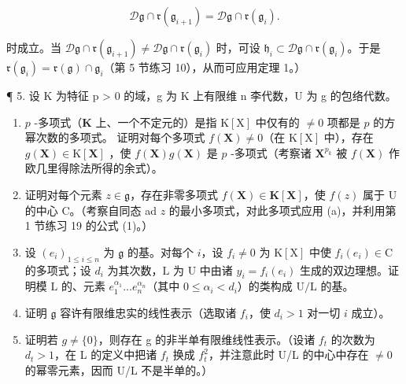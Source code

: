 \[
\mathscr {D} \mathfrak {g} \cap \mathfrak {r} (\mathfrak {g} _ {i + 1}) = \mathscr {D} \mathfrak {g} \cap \mathfrak {r} (\mathfrak {g} _ {i}).
\]

时成立。当 \(\mathcal{D}\mathfrak{g} \cap \mathfrak{r}(\mathfrak{g}_{i+1}) \neq \mathcal{D}\mathfrak{g} \cap \mathfrak{r}(\mathfrak{g}_i)\) 时，可设 \(\mathfrak{h}_i \subset \mathcal{D}\mathfrak{g} \cap \mathfrak{r}(\mathfrak{g}_i)\)。于是 \(\mathfrak{r}(\mathfrak{g}_i) = \mathfrak{r}(\mathfrak{g}) \cap \mathfrak{g}_i\)（第 5 节练习 10），从而可应用定理 1。）

¶ 5. 设 K 为特征 p \textgreater{} 0 的域，g 为 K 上有限维 n 李代数，U 为 g 的包络代数。

\begin{enumerate}
\def\labelenumi{(\alph{enumi})}
\item
  \(p\) -多项式（\(\mathbf{K}\) 上、一个不定元的）是指 \(\mathrm{K}[\mathrm{X}]\) 中仅有的 \(\neq 0\) 项都是 \(p\) 的方幂次数的多项式。 证明对每个多项式 \(f(\mathbf{X}) \neq 0\)（在 \(\mathrm{K}[\mathrm{X}]\) 中），存在 \(g(\mathbf{X}) \in \mathrm{K}[\mathbf{X}]\) ，使 \(f(\mathbf{X})g(\mathbf{X})\) 是 \(p\) -多项式（考察诸 \(\mathbf{X}^{p_k}\) 被 \(f(\mathbf{X})\) 作欧几里得除法所得的余式）。
\item
  证明对每个元素 \(z \in \mathfrak{g}\)，存在非零多项式 \(f(\mathbf{X}) \in \mathbf{K}[\mathbf{X}]\)，使 \(f(z)\) 属于 U 的中心 C。（考察自同态 ad \(z\) 的最小多项式，对此多项式应用 (a)，并利用第 1 节练习 19 的公式 (1)。）
\item
  设 \((e_i)_{1\leqslant i\leqslant n}\) 为 \(\mathfrak{g}\) 的基。对每个 \(i\)，设 \(f_{i}\neq 0\) 为 \(\mathrm{K}[\mathrm{X}]\) 中使 \(f_{i}(e_{i})\in \mathrm{C}\) 的多项式；设 \(d_{i}\) 为其次数，\(\mathrm{L}\) 为 \(\mathrm{U}\) 中由诸 \(y_{i} = f_{i}(e_{i})\) 生成的双边理想。证明模 \(\mathrm{L}\) 的、元素 \(e_1^{\alpha_1}\ldots e_n^{\alpha_n}\)（其中 \(0\leqslant \alpha_{i} < d_{i}\)）的类构成 \(\mathrm{U / L}\) 的基。
\item
  证明 \(\mathfrak{g}\) 容许有限维忠实的线性表示（选取诸 \(f_{i}\)，使 \(d_{i} > 1\) 对一切 \(i\) 成立）。
\item
  证明若 \(g \neq \{0\}\)，则存在 g 的非半单有限维线性表示。（设诸 \(f_{t}\) 的次数为 \(d_{t} > 1\)，在 L 的定义中把诸 \(f_{t}\) 换成 \(f_{t}^{2}\)，并注意此时 U/L 的中心中存在 \(\neq 0\) 的幂零元素，因而 U/L 不是半单的。）
\end{enumerate}


